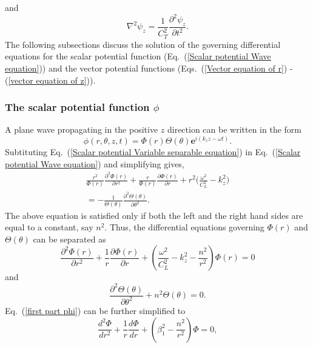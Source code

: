\documentclass[10pt]{asme2ej}
\begin{document}
 and
 \begin{equation}\label{vector equation of z}
     \nabla^{2}\psi_{z}= \frac{1}{C_T^{2}}\frac{\partial^{2}\psi_{z}}{\partial t^{2}}.
 \end{equation}
The following subsections discuss the solution of the governing differential equations for the scalar potential function (Eq.~(\ref{Scalar potential Wave equation})) and the vector potential functions (Eqs.~(\ref{Vector equation of r}) - (\ref{vector equation of z})).

 \subsubsection{The scalar potential function $\phi$}
 A plane wave propagating in the positive $z$ direction can be written in the form
 \begin{equation}\label{Scalar potential Variable separable equation}
    \phi(r,\theta,z,t) = \Phi(r)\Theta(\theta)\mathbf{e}^{i(k_{z}z-\omega t)}.   
 \end{equation}
Subtituting Eq.~(\ref{Scalar potential Variable separable equation}) in  Eq.~(\ref{Scalar potential Wave equation}) and simplifying gives,
\begin{multline}
    \frac{r^{2}}{\Phi(r)}\frac{\partial^{2} \Phi(r)}{\partial r^{2}} + \frac{r}{\Phi(r)}\frac{\partial \Phi(r)}{\partial r} + r^2\bigg(\frac{\omega^{2}}{C_{L}^{2}}-k_{z}^{2}\bigg)\\ = -\frac{1}{\Theta(\theta)}\frac{\partial^{2} \Theta(\theta)}{\partial \theta^{2}}.
\end{multline}
The above equation is satisfied only if both the left and the right hand sides are equal to a constant, say $n^{2}$. Thus, the differential equations governing $\Phi(r)$ and $\Theta(\theta)$ can be separated as 
\begin{equation}\label{first part phi}
    \frac{\partial^{2} \Phi(r)}{\partial r^{2}} + \frac{1}{r}\frac{\partial \Phi(r)}{\partial r} + \left(\frac{\omega^{2}}{C_{L}^{2}}-k_{z}^{2} - \frac{n^{2}}{r^{2}}\right)\Phi(r) = 0
\end{equation}
and
\begin{equation}\label{second part phi}
    \frac{\partial^{2} \Theta(\theta)}{\partial \theta^{2}} + n^{2}\Theta(\theta) = 0.
\end{equation}
Eq.~(\ref{first part phi}) can be further simplified to 
\begin{equation}\label{bessel form scalar potential}
    \frac{d^{2}\Phi}{dr^{2}} + \frac{1}{r}\frac{d\Phi}{dr} + \left(\beta_1^{2} - \frac{n^{2}}{r^{2}}\right)\Phi = 0,
\end{equation}
\end{document}
